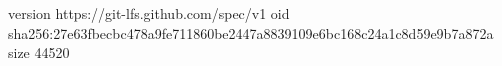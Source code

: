 version https://git-lfs.github.com/spec/v1
oid sha256:27e63fbecbc478a9fe711860be2447a8839109e6bc168c24a1c8d59e9b7a872a
size 44520
